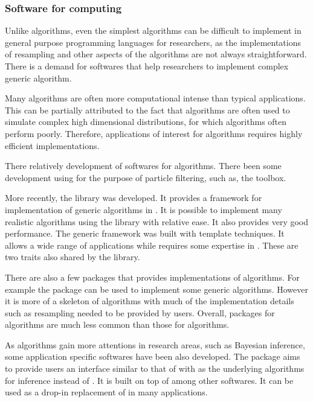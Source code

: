 \subsubsection{Software for \protect\smc computing}
\label{ssub:Softwares for smc computing}

Unlike \mcmc algorithms, even the simplest \smc algorithms can be difficult to implement in general purpose programming languages for researchers, as the implementations of resampling and other aspects of the algorithms are not always straightforward. There is a demand for softwares that help researchers to implement complex generic \smc algorithm.

Many \smc algorithms are often more computational intense than typical \mcmc applications. This can be partially attributed to the fact that \smc algorithms are often used to simulate complex high dimensional distributions, for which \mcmc algorithms often perform poorly. Therefore, applications of interest for \smc algorithms requires highly efficient implementations.

There  relatively  development of softwares for \smc algorithms. There  been some development using \matlab for the purpose of particle filtering, such as, the \pflib \cite{pflib} toolbox.

More recently, the \smctc library \cite{smctc} was developed. It provides a framework for implementation of generic \smc algorithms in \cpp. It is possible to implement many realistic algorithms using the library with relative ease. It also provides very good performance. The generic framework was built with \cpp template techniques. It allows a wide range of applications while requires some expertise in \cpp. These are two traits also shared by the \vsmc library.

There are also a few \rlang packages that provides implementations of \smc algorithms. For example the \rsmc \cite{rsmc} package can be used to implement some generic \smc algorithms. However it is more of a skeleton of \smc algorithms with much of the implementation details such as resampling needed to be provided by users. Overall, \rlang packages for \smc algorithms are much less common than those for \mcmc algorithms.

As \smc algorithms gain more attentions in research areas, such as Bayesian inference, some application specific softwares have been also developed. The \biips \cite{biips} package aims to provide users an interface similar to that of \bugs with \smc as the underlying algorithms for inference instead of \mcmc. It is built on top of \smctc among other softwares. It can be used as a drop-in replacement of \bugs in many applications.

